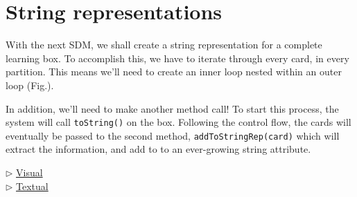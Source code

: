 \newpage
\section{String representations}
\genHeader
\hypertarget{sec:stringRep}{}

With the next SDM, we shall create a string representation for a complete learning box. To accomplish this, we have to iterate through every card, in every
partition. This means we'll need to create an inner loop nested within an outer loop (Fig.).


In addition, we'll need to make another method call! To start this process, the system will call \texttt{toString()} on the box. Following the control flow, 
the cards will eventually be passed to the second method, \texttt{addToStringRep(card)} which will extract the information, and add to to an ever-growing
string attribute.

\begin{center} {$\triangleright$ \hyperlink{stringRep vis}{Visual}}%
\\ \vspace{0.5cm} {$\triangleright$ \hyperlink{stringRep tex}{Textual} }\end{center} 



